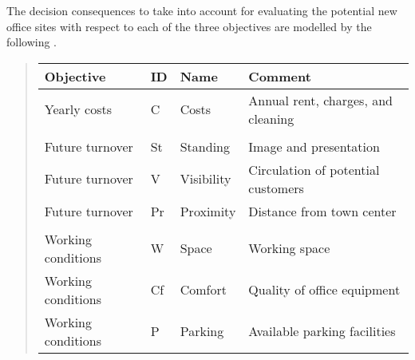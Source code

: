 \documentclass[a4paper,10pt,english]{sphinxhowto}
\begin{document}
The decision consequences to take into account for evaluating the potential new office sites with respect to each of the three objectives are modelled by the following .
\begin{quote}


\begin{savenotes}\sphinxattablestart
\centering
\begin{tabulary}{\linewidth}[t]{|T|T|T|T|}
\hline
\sphinxstyletheadfamily 
Objective
&\sphinxstyletheadfamily 
ID
&\sphinxstyletheadfamily 
Name
&\sphinxstyletheadfamily 
Comment
\\
\hline
Yearly costs
&
C
&
Costs
&
Annual rent, charges, and cleaning
\\
\hline

&

&

&

\\
\hline
Future turnover
&
St
&
Standing
&
Image and presentation
\\
\hline
Future turnover
&
V
&
Visibility
&
Circulation of potential customers
\\
\hline
Future turnover
&
Pr
&
Proximity
&
Distance from town center
\\
\hline

&

&

&

\\
\hline
Working conditions
&
W
&
Space
&
Working space
\\
\hline
Working conditions
&
Cf
&
Comfort
&
Quality of office equipment
\\
\hline
Working conditions
&
P
&
Parking
&
Available parking facilities
\\
\hline
\end{tabulary}
\par
\sphinxattableend\end{savenotes}
\end{quote}
\end{document}
